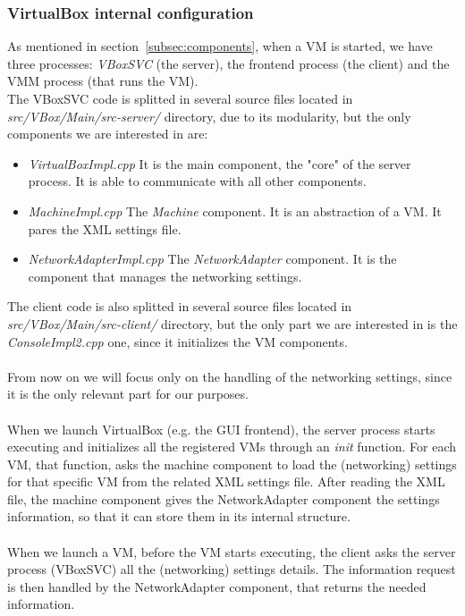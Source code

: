 \documentclass[a4paper, 12pt, titlepage]{report}
\begin{document}
\subsubsection{VirtualBox internal configuration}
As mentioned in section~\ref{subsec:components}, when a VM is started, we have three processes: \textit{VBoxSVC} (the server), the frontend process (the client) and the VMM process (that runs the VM).
\\
The VBoxSVC code is splitted in several source files located in \textit{src/VBox/Main/src-server/} directory, due to its modularity, but the only components we are interested in are:
\begin{itemize}
\item \textit{VirtualBoxImpl.cpp} It is the main component, the "core" of the server process. It is able to communicate with all other components.
\item \textit{MachineImpl.cpp} The \textit{Machine} component. It is an abstraction of a VM. It pares the XML settings file.
\item \textit{NetworkAdapterImpl.cpp} The \textit{NetworkAdapter} component. It is the component that manages the networking settings.
\end{itemize}
The client code is also splitted in several source files located in \textit{src/VBox/Main/src-client/} directory, but the only part we are interested in is the \textit{ConsoleImpl2.cpp} one, since it initializes the VM components.
\\
\\
From now on we will focus only on the handling of the networking settings, since it is the only relevant part for our purposes.
\\
\\
When we launch VirtualBox (e.g. the GUI frontend), the server process starts executing and initializes all the registered VMs through an \textit{init} function. For each VM, that function, asks the machine component to load the (networking) settings for that specific VM from the related XML settings file. After reading the XML file, the machine component gives the NetworkAdapter component the settings information, so that it can store them in its internal structure.
\\
\\
When we launch a VM, before the VM starts executing, the client asks the server process (VBoxSVC) all the (networking) settings details. The information request is then handled by the NetworkAdapter component, that returns the needed information.
\end{document}
